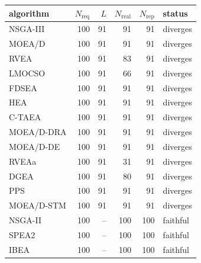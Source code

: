 \scriptsize
\setlength{\tabcolsep}{5pt}
\begin{tabular}{lrrrrl}
\toprule
algorithm & $N_{\mathrm{req}}$ & $L$ & $N_{\mathrm{real}}$ & $N_{\mathrm{rep}}$ & status \\
\midrule
NSGA-III & 100 & 91 & 91 & 91 & diverges \\
MOEA/D & 100 & 91 & 91 & 91 & diverges \\
RVEA & 100 & 91 & 83 & 91 & diverges \\
LMOCSO & 100 & 91 & 66 & 91 & diverges \\
FDSEA & 100 & 91 & 91 & 91 & diverges \\
HEA & 100 & 91 & 91 & 91 & diverges \\
C-TAEA & 100 & 91 & 91 & 91 & diverges \\
MOEA/D-DRA & 100 & 91 & 91 & 91 & diverges \\
MOEA/D-DE & 100 & 91 & 91 & 91 & diverges \\
RVEAa & 100 & 91 & 31 & 91 & diverges \\
DGEA & 100 & 91 & 80 & 91 & diverges \\
PPS & 100 & 91 & 91 & 91 & diverges \\
MOEA/D-STM & 100 & 91 & 91 & 91 & diverges \\
\addlinespace
NSGA-II & 100 & -- & 100 & 100 & faithful \\
SPEA2 & 100 & -- & 100 & 100 & faithful \\
IBEA & 100 & -- & 100 & 100 & faithful \\
\bottomrule
\end{tabular}

